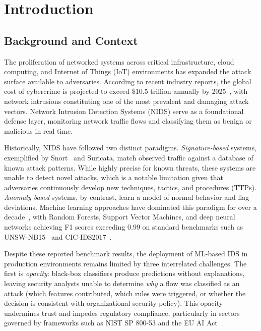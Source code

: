 \documentclass[12pt, letterpaper, oneside]{report}
\begin{document}
\chapter{Introduction}
\label{ch:introduction}

\section{Background and Context}
\label{sec:background}

The proliferation of networked systems across critical infrastructure, cloud computing, and Internet of Things (IoT) environments has expanded the attack surface available to adversaries. According to recent industry reports, the global cost of cybercrime is projected to exceed \$10.5 trillion annually by 2025~\cite{barbero2022}, with network intrusions constituting one of the most prevalent and damaging attack vectors. Network Intrusion Detection Systems (NIDS) serve as a foundational defense layer, monitoring network traffic flows and classifying them as benign or malicious in real time.

Historically, NIDS have followed two distinct paradigms. \emph{Signature-based} systems, exemplified by Snort~\cite{roesch1999} and Suricata, match observed traffic against a database of known attack patterns. While highly precise for known threats, these systems are unable to detect novel attacks, which is a notable limitation given that adversaries continuously develop new techniques, tactics, and procedures (TTPs). \emph{Anomaly-based} systems, by contrast, learn a model of normal behavior and flag deviations. Machine learning approaches have dominated this paradigm for over a decade~\cite{buczak2016}, with Random Forests, Support Vector Machines, and deep neural networks achieving F1 scores exceeding 0.99 on standard benchmarks such as UNSW-NB15~\cite{moustafa2015} and CIC-IDS2017~\cite{sharafaldin2018}.

Despite these reported benchmark results, the deployment of ML-based IDS in production environments remains limited by three interrelated challenges. The first is \emph{opacity}: black-box classifiers produce predictions without explanations, leaving security analysts unable to determine \emph{why} a flow was classified as an attack (which features contributed, which rules were triggered, or whether the decision is consistent with organizational security policy). This opacity undermines trust and impedes regulatory compliance, particularly in sectors governed by frameworks such as NIST SP 800-53 and the EU AI Act~\cite{buczak2016}.
\end{document}
